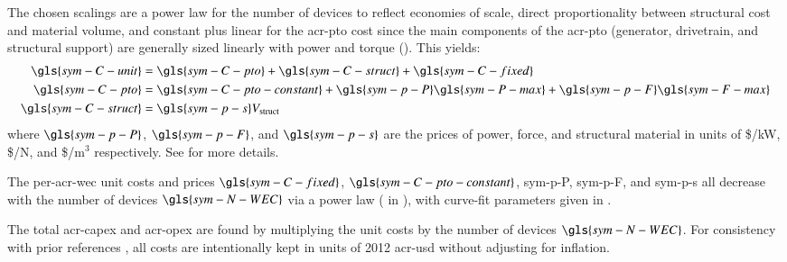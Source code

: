The chosen scalings are a power law for the number of devices to reflect economies of scale, direct proportionality between structural cost and material volume, and constant plus linear for the \gls{acr-pto} cost since the main components of the \gls{acr-pto} (generator, drivetrain, and structural support) are generally sized linearly with power and torque ().
This yields:
\begin{equation}\label{eq:unit-cost}
\begin{aligned}
    \gls{sym-C-unit}   &= \gls{sym-C-pto} + \gls{sym-C-struct} + \gls{sym-C-fixed} \\
    \gls{sym-C-pto}    &= \gls{sym-C-pto-constant} + \gls{sym-p-P} \gls{sym-P-max} + \gls{sym-p-F} \gls{sym-F-max} \\
    \gls{sym-C-struct} &= \gls{sym-p-s} V_{\text{struct}}
\end{aligned}
\end{equation}
where $\gls{sym-p-P}$, $\gls{sym-p-F}$, and $\gls{sym-p-s}$ are the prices of power, force, and structural material in units of \$/kW, \$/N, and \$/m$^3$ respectively.
See  for more details.

The per-\gls{acr-wec} unit costs and prices $\gls{sym-C-fixed}$, $\gls{sym-C-pto-constant}$, \gls{sym-p-P}, \gls{sym-p-F}, and \gls{sym-p-s} all decrease with the number of devices $\gls{sym-N-WEC}$ via a power law ( in ), with curve-fit parameters given in .

The total \gls{acr-capex} and \gls{acr-opex} are found by multiplying the unit costs by the number of devices $\gls{sym-N-WEC}$.
For consistency with prior references \citep{neary_reference_2014,RM3}, all costs are intentionally kept in units of 2012 \gls{acr-usd} without adjusting for inflation.
